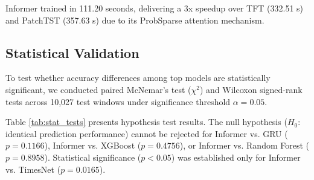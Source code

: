 \begin{table}[htbp]
\caption{Training Time Comparison Across Key Architectures (50 Epochs)}
\centering
{}
\label{tab:training_time}
\end{table}

Informer trained in 111.20 seconds, delivering a 3x speedup over TFT (332.51 s) and PatchTST (357.63 s) due to its ProbSparse attention mechanism.

\subsection{Statistical Validation}
To test whether accuracy differences among top models are statistically significant, we conducted paired McNemar's test ($\chi^2$) and Wilcoxon signed-rank tests across 10,027 test windows under significance threshold $\alpha = 0.05$.

Table \ref{tab:stat_tests} presents hypothesis test results. The null hypothesis ($H_0$: identical prediction performance) cannot be rejected for Informer vs. GRU ($p = 0.1166$), Informer vs. XGBoost ($p = 0.4756$), or Informer vs. Random Forest ($p = 0.8958$). Statistical significance ($p < 0.05$) was established only for Informer vs. TimesNet ($p = 0.0165$).

\begin{table}[htbp]
\caption{Pairwise Statistical Hypothesis Test Results ($\alpha = 0.05$)}
\centering
{}
\label{tab:stat_tests}
\end{table}


